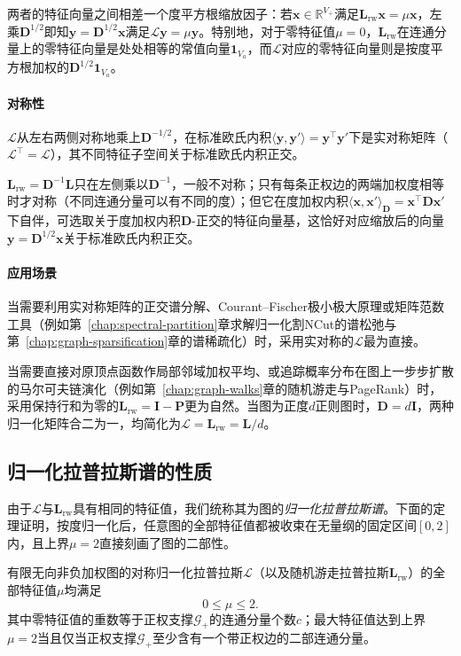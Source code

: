 两者的特征向量之间相差一个度平方根缩放因子：若$\bm x\in\mathbb R^{V_+}$满足$\bm L_{\mathrm{rw}}\bm x=\mu\bm x$，左乘$\bm D^{1/2}$即知$\bm y=\bm D^{1/2}\bm x$满足$\mathcal L\bm y=\mu\bm y$。特别地，对于零特征值$\mu=0$，$\bm L_{\mathrm{rw}}$在连通分量上的零特征向量是处处相等的常值向量$\bm 1_{V_a}$，而$\mathcal L$对应的零特征向量则是按度平方根加权的$\bm D^{1/2}\bm 1_{V_a}$。

\paragraph{对称性}
$\mathcal L$从左右两侧对称地乘上$\bm D^{-1/2}$，在标准欧氏内积$\langle\bm y,\bm y'\rangle=\bm y^\top\bm y'$下是实对称矩阵（$\mathcal L^\top=\mathcal L$），其不同特征子空间关于标准欧氏内积正交。

$\bm L_{\mathrm{rw}}=\bm D^{-1}\bm L$只在左侧乘以$\bm D^{-1}$，一般不对称；只有每条正权边的两端加权度相等时才对称（不同连通分量可以有不同的度）；但它在度加权内积$\langle\bm x,\bm x'\rangle_{\bm D}=\bm x^\top\bm D\bm x'$下自伴，可选取关于度加权内积$\bm D$-正交的特征向量基，这恰好对应缩放后的向量$\bm y=\bm D^{1/2}\bm x$关于标准欧氏内积正交。

\paragraph{应用场景}
当需要利用实对称矩阵的正交谱分解、Courant--Fischer极小极大原理或矩阵范数工具（例如第~\ref{chap:spectral-partition}章求解归一化割NCut的谱松弛与第~\ref{chap:graph-sparsification}章的谱稀疏化）时，采用实对称的$\mathcal L$最为直接。

当需要直接对原顶点函数作局部邻域加权平均、或追踪概率分布在图上一步步扩散的马尔可夫链演化（例如第~\ref{chap:graph-walks}章的随机游走与PageRank）时，采用保持行和为零的$\bm L_{\mathrm{rw}}=\bm I-\bm P$更为自然。当图为正度$d$正则图时，$\bm D=d\bm I$，两种归一化矩阵合二为一，均简化为$\mathcal L=\bm L_{\mathrm{rw}}=\bm L/d$。

\subsection{归一化拉普拉斯谱的性质}
\label{sec:graph-normalized-laplacian-spectrum}

由于$\mathcal L$与$\bm L_{\mathrm{rw}}$具有相同的特征值，我们统称其为图的\emph{归一化拉普拉斯谱}。下面的定理证明，按度归一化后，任意图的全部特征值都被收束在无量纲的固定区间$[0,2]$内，且上界$\mu=2$直接刻画了图的二部性。

\begin{theorem}[归一化拉普拉斯谱的范围]
\label{prop:graph-normalized-spectrum-bound}
有限无向非负加权图的对称归一化拉普拉斯$\mathcal L$（以及随机游走拉普拉斯$\bm L_{\mathrm{rw}}$）的全部特征值$\mu$均满足
\begin{equation}
  0\leq\mu\leq2.
  \label{eq:graph-normalized-spectrum-bound}
\end{equation}
其中零特征值的重数等于正权支撑$\mathcal G_+$的连通分量个数$c$；最大特征值达到上界$\mu=2$当且仅当正权支撑$\mathcal G_+$至少含有一个带正权边的二部连通分量。
\end{theorem}

